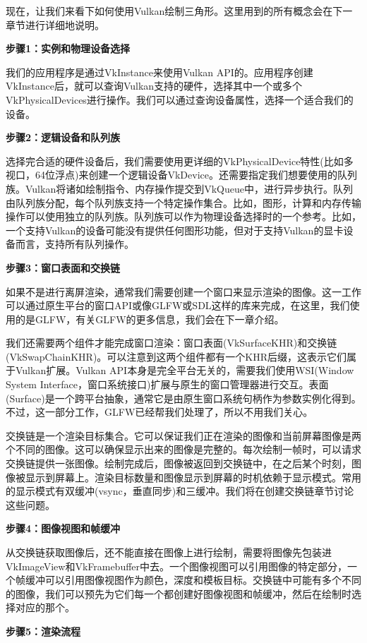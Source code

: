 \documentclass{ctexart}
\begin{document}
现在，让我们来看下如何使用Vulkan绘制三角形。这里用到的所有概念会在下一章节进行详细地说明。

\textbf{步骤1：实例和物理设备选择}

我们的应用程序是通过VkInstance来使用Vulkan API的。应用程序创建VkInstance后，就可以查询Vulkan支持的硬件，选择其中一个或多个VkPhysicalDevices进行操作。我们可以通过查询设备属性，选择一个适合我们的设备。

\textbf{步骤2：逻辑设备和队列族}

选择完合适的硬件设备后，我们需要使用更详细的VkPhysicalDevice特性(比如多视口，64位浮点)来创建一个逻辑设备VkDevice。还需要指定我们想要使用的队列族。Vulkan将诸如绘制指令、内存操作提交到VkQueue中，进行异步执行。队列由队列族分配，每个队列族支持一个特定操作集合。比如，图形，计算和内存传输操作可以使用独立的队列族。队列族可以作为物理设备选择时的一个参考。比如，一个支持Vulkan的设备可能没有提供任何图形功能，但对于支持Vulkan的显卡设备而言，支持所有队列操作。

\textbf{步骤3：窗口表面和交换链}

如果不是进行离屏渲染，通常我们需要创建一个窗口来显示渲染的图像。这一工作可以通过原生平台的窗口API或像GLFW或SDL这样的库来完成，在这里，我们使用的是GLFW，有关GLFW的更多信息，我们会在下一章介绍。

我们还需要两个组件才能完成窗口渲染：窗口表面(VkSurfaceKHR)和交换链(VkSwapChainKHR)。可以注意到这两个组件都有一个KHR后缀，这表示它们属于Vulkan扩展。Vulkan API本身是完全平台无关的，需要我们使用WSI(Window System Interface，窗口系统接口)扩展与原生的窗口管理器进行交互。表面(Surface)是一个跨平台抽象，通常它是由原生窗口系统句柄作为参数实例化得到。不过，这一部分工作，GLFW已经帮我们处理了，所以不用我们关心。

交换链是一个渲染目标集合。它可以保证我们正在渲染的图像和当前屏幕图像是两个不同的图像。这可以确保显示出来的图像是完整的。每次绘制一帧时，可以请求交换链提供一张图像。绘制完成后，图像被返回到交换链中，在之后某个时刻，图像被显示到屏幕上。渲染目标数量和图像显示到屏幕的时机依赖于显示模式。常用的显示模式有双缓冲(vsync，垂直同步)和三缓冲。我们将在创建交换链章节讨论这些问题。

\textbf{步骤4：图像视图和帧缓冲}

从交换链获取图像后，还不能直接在图像上进行绘制，需要将图像先包装进VkImageView和VkFramebuffer中去。一个图像视图可以引用图像的特定部分，一个帧缓冲可以引用图像视图作为颜色，深度和模板目标。交换链中可能有多个不同的图像，我们可以预先为它们每一个都创建好图像视图和帧缓冲，然后在绘制时选择对应的那个。

\textbf{步骤5：渲染流程}
\end{document}
